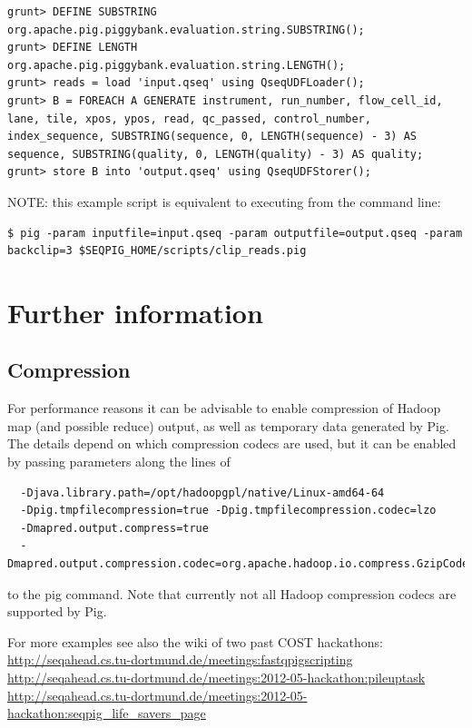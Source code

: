 \begin{lstlisting}
grunt> DEFINE SUBSTRING org.apache.pig.piggybank.evaluation.string.SUBSTRING();
grunt> DEFINE LENGTH org.apache.pig.piggybank.evaluation.string.LENGTH();
grunt> reads = load 'input.qseq' using QseqUDFLoader();
grunt> B = FOREACH A GENERATE instrument, run_number, flow_cell_id, lane, tile, xpos, ypos, read, qc_passed, control_number, index_sequence, SUBSTRING(sequence, 0, LENGTH(sequence) - 3) AS sequence, SUBSTRING(quality, 0, LENGTH(quality) - 3) AS quality;
grunt> store B into 'output.qseq' using QseqUDFStorer();
\end{lstlisting}
NOTE: this example script is equivalent to executing from the command line:
\begin{lstlisting}
$ pig -param inputfile=input.qseq -param outputfile=output.qseq -param backclip=3 $SEQPIG_HOME/scripts/clip_reads.pig
\end{lstlisting}

\section{Further information}

\subsection{Compression}

For performance reasons it can be advisable to enable compression of
Hadoop map (and possible reduce) output, as well as temporary data generated
by Pig. The details depend on which compression codecs are used, but it can
be enabled by passing parameters along the lines of
\begin{lstlisting}
  -Djava.library.path=/opt/hadoopgpl/native/Linux-amd64-64
  -Dpig.tmpfilecompression=true -Dpig.tmpfilecompression.codec=lzo
  -Dmapred.output.compress=true
  -Dmapred.output.compression.codec=org.apache.hadoop.io.compress.GzipCodec
\end{lstlisting}

 to the pig command. Note that currently not all Hadoop compression codecs are
 supported by Pig.

For more examples see also the wiki of two past COST hackathons:\\
\url{http://seqahead.cs.tu-dortmund.de/meetings:fastqpigscripting}\\
\url{http://seqahead.cs.tu-dortmund.de/meetings:2012-05-hackathon:pileuptask}\\
\url{http://seqahead.cs.tu-dortmund.de/meetings:2012-05-hackathon:seqpig_life_savers_page}

